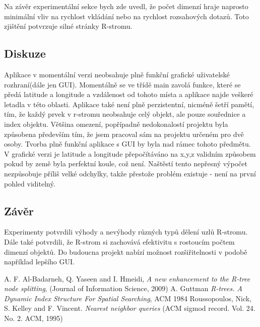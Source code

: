 \documentclass[12pt,a4paper]{article}
\begin{document}
Na závěr experimentální sekce bych zde uvedl, že počet dimenzí hraje naprosto minimální vliv na rychlost vkládání nebo na rychlost rozsahových dotazů. Toto zjištění potvrzuje silné stránky R-stromu.

\subsection*{Diskuze}
Aplikace v momentální verzi neobsahuje plně funkční grafické uživatelské rozhraní(dále jen GUI). Momentálně se ve třídě main zavolá funkce, které se předá latitude a longitude a vzdálenost od tohoto místa a aplikace najde veškeré letadla v této oblasti. Aplikace také není plně perzistentní, nicméně šetří pamětí, tím, že každý prvek v r-stromu neobsahuje celý objekt, ale pouze souřednice a index objektu. Většina omezení, popřípadně nedokonalostí projektu byla způsobena především tím, že jsem pracoval sám na projektu určeném pro dvě osoby. Tvorba plně funkční aplikace s GUI by byla nad rámec tohoto předmětu. V grafické verzi je latitude a longitude přepočítáváno na x,y,z validním způsobem pokud by země byla perfektní koule, což není. Naštěstí tento nepřesný výpočet nezpůsobuje příliš velké odchylky, takže přestože problém existuje - není na první pohled viditelný. 

\subsection*{Závěr}
Experimenty potvrdili výhody a nevýhody různých typů dělení uzlů R-stromu. Dále také potvrdili, že R-strom si zachovává efektivitu s rostoucím počtem dimenzí objektů. Do budoucna projekt nabízí možnost rozšiřitelnosti v podobě například lepšího GUI.


\begin{thebibliography}{9}
 A. F. Al-Badarneh, Q. Yaseen and I. Hmeidi, \textit{A new enhancement to the
R-tree node splitting},
(Journal of Information Science, 2009)
 A. Guttman \textit{R-trees. A Dynamic Index Structure
For Spatial Searching}, ACM 1984
 Roussopoulos, Nick, S. Kelley and F. Vincent. \textit{Nearest neighbor queries} 
(ACM sigmod record. Vol. 24. No. 2. ACM, 1995)
\end{thebibliography}
\end{document}
